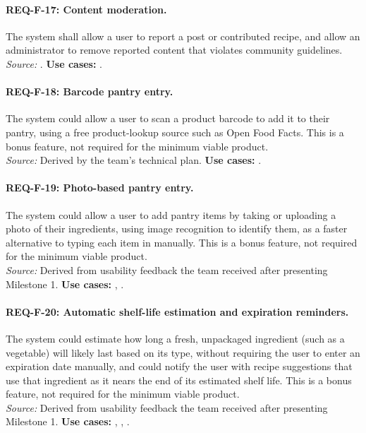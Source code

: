 \paragraph{REQ-F-17: Content moderation.}
 The system shall allow a user to report a post or contributed recipe, and allow an administrator to remove reported content that violates community guidelines.\\
\textit{Source:} . \textbf{Use cases:} .

\paragraph{REQ-F-18: Barcode pantry entry.}
 The system could allow a user to scan a product barcode to add it to their pantry, using a free product-lookup source such as Open Food Facts. This is a bonus feature, not required for the minimum viable product.\\
\textit{Source:} Derived by the team's technical plan. \textbf{Use cases:} .

\paragraph{REQ-F-19: Photo-based pantry entry.}
 The system could allow a user to add pantry items by taking or uploading a photo of their ingredients, using image recognition to identify them, as a faster alternative to typing each item in manually. This is a bonus feature, not required for the minimum viable product.\\
\textit{Source:} Derived from usability feedback the team received after presenting Milestone 1. \textbf{Use cases:} , .

\paragraph{REQ-F-20: Automatic shelf-life estimation and expiration reminders.}
 The system could estimate how long a fresh, unpackaged ingredient (such as a vegetable) will likely last based on its type, without requiring the user to enter an expiration date manually, and could notify the user with recipe suggestions that use that ingredient as it nears the end of its estimated shelf life. This is a bonus feature, not required for the minimum viable product.\\
\textit{Source:} Derived from usability feedback the team received after presenting Milestone 1. \textbf{Use cases:} , , .


